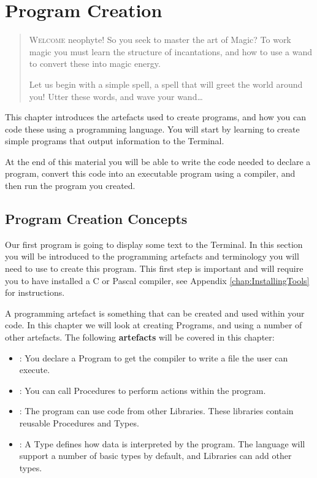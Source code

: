 \chapter{Program Creation} %
\label{cha:program_creation}

\begin{quote}
  \Fontlukas\Large
  \renewcommand{\LettrineTextFont}{\relax}
  \renewcommand{\LettrineFontHook}{\color{red}}
  \lettrine[image=true,lines=3,lhang=.2, loversize=.25, findent=0.1em]
  {W}{elcome} neophyte! So you seek to master the art of Magic? To work magic you must learn the structure of incantations, and how to use a wand to convert these into magic energy. 
  
  Let us begin with a simple spell, a spell that will greet the world around you! Utter these words, and wave your wand\ldots
\end{quote}

\bigskip

This chapter introduces the artefacts used to create programs, and how you can code these using a programming language. You will start by learning to create simple programs that output information to the Terminal.

At the end of this material you will be able to write the code needed to declare a program, convert this code into an executable program using a compiler, and then run the program you created.

\minitoc

\clearpage
\section{Program Creation Concepts} %
\label{sec:program_creation_concepts}

Our first program is going to display some text to the Terminal. In this section you will be introduced to the programming artefacts and terminology you will need to use to create this program. This first step is important and will require you to have installed a C or Pascal compiler, see Appendix \ref{chap:InstallingTools} for instructions.

A programming artefact is something that can be created and used within your code. In this chapter we will look at creating Programs, and using a number of other artefacts. The following \textbf{artefacts} will be covered in this chapter:
\begin{itemize}
  \item {}: You declare a Program to get the compiler to write a file the user can execute.
  \item {}: You can call Procedures to perform actions within the program.
  \item {}: The program can use code from other Libraries. These libraries contain reusable Procedures and Types. 
  \item {}: A Type defines how data is interpreted by the program. The language will support a number of basic types by default, and Libraries can add other types. 
\end{itemize}

